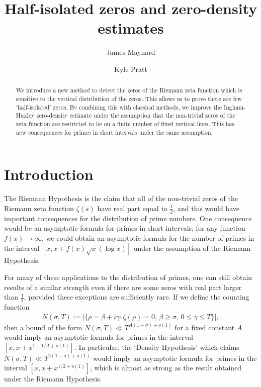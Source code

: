 \documentclass[12pt]{amsart}
\title{Half-isolated zeros and zero-density estimates}
\author{James Maynard}
\author{Kyle Pratt}
\theoremstyle{plain}
\theoremstyle{definition}
\theoremstyle{remark}
\begin{document}
%
%
%
%
\begin{abstract}
We introduce a new method to detect the zeros of the Riemann zeta function which is sensitive to the vertical distribution of the zeros. This allows us to prove there are few `half-isolated' zeros. By combining this with classical methods, we improve the Ingham-Huxley zero-density estimate under the assumption that the non-trivial zeros of the zeta function are restricted to lie on a finite number of fixed vertical lines. This has new consequences for primes in short intervals under the same assumption.
\end{abstract}
%
%
%
%
\maketitle
%
%
%
%
%
%
%
%
\section{Introduction}
%
%
%
%
The Riemann Hypothesis is the claim that all of the non-trivial zeros of the Riemann zeta function $\zeta(s)$ have real part equal to $\frac{1}{2}$, and this would have important consequences for the distribution of prime numbers. One consequence would be an asymptotic formula for primes in short intervals; for any function $f(x)\rightarrow\infty$, we could obtain an asymptotic formula for the number of primes in the interval $[x,x+f(x)\sqrt{x}(\log x)]$ under the assumption of the Riemann Hypothesis.

For many of these applications to the distribution of primes, one can still obtain results of a similar strength even if there are some zeros with real part larger than $\frac{1}{2}$, provided these exceptions are sufficiently rare. If we define the counting function
%
\begin{align*}
N(\sigma,T) := |\{ \rho = \beta +i\gamma : \zeta(\rho) = 0,\, \beta \geq \sigma,\,0\leq \gamma \leq T\}|,
\end{align*}
%
then a bound of the form $N(\sigma,T)\ll T^{A(1-\sigma)+o(1)}$ for a fixed constant $A$ would imply an asymptotic formula for primes in the interval $[x,x+x^{1-1/A+o(1)}]$. In particular, the `Density Hypothesis' which claims $N(\sigma,T)\ll T^{2(1-\sigma)+o(1)}$ would imply an asymptotic formula for primes in the interval $[x,x+x^{1/2+o(1)}]$, which is almost as strong as the result obtained under the Riemann Hypothesis.
\end{document}
